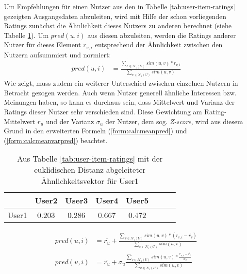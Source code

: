 Um Empfehlungen für einen Nutzer aus den in Tabelle \ref{tab:user-item-ratings} gezeigten Ausgangsdaten abzuleiten, wird mit Hilfe der schon vorliegenden Ratings zunächst die Ähnlichkeit dieses Nutzers zu anderen berechnet (siehe Tabelle \ref{tab:user-user-sim}). Um $pred(u,i)$ aus diesen abzuleiten, werden die Ratings anderer Nutzer für dieses Element $r_{v,i}$ entsprechend der Ähnlichkeit zwischen den Nutzern aufsummiert und normiert:
\begin{align}
pred(u,i) & = \frac{ \sum_{v \in \mathcal{N}_i(U)} sim(u, v)*r_{v,i}}{ \sum_{v \in \mathcal{N}_i(U)} sim(u,v) } \label{form:calcpred}
\end{align}
Wie \citep{Herlocker:2002:EAD:593967.594047} zeigt, muss zudem ein weiterer Unterschied zwischen einzelnen Nutzern in Betracht gezogen werden. Auch wenn Nutzer generell ähnliche Interessen bzw. Meinungen haben, so kann es durchaus sein, dass Mittelwert und Varianz der Ratings dieser Nutzer sehr verschieden sind. Diese Gewichtung am Rating-Mittelwert $\overline{r_u}$ und der Varianz  $\sigma_u$ der Nutzer, dem sog. \textit{Z-score}, wird aus diesem Grund in den erweiterten Formeln (\ref{form:calcmeanpred}) und (\ref{form:calcmeanvarpred}) beachtet. \citep{hb_04,Huete:2012:UPA:2206442.2206675} 
\begin{table}
  \centering
  \begin{tabular}{ | l || c | c | c | c | c | c | c | }
    \hline
           & User2 & User3 & User4 & User5 \\ \hline
User1 &    0.203 &	0.286 &	0.667 & 0.472 \\	
    \hline
  \end{tabular}
  \caption{\footnotesize Aus Tabelle \ref{tab:user-item-ratings} mit der euklidischen Distanz abgeleiteter Ähnlichkeitsvektor für User1}
  \label{tab:user-user-sim}
\end{table}
\begin{align}
pred(u, i) & = \overline{r_u} + \frac{ \sum_{v \in \mathcal{N}_i(U)} sim(u, v)*(r_{v,i}-\overline{r_v}) } { \sum_{v \in \mathcal{N}_i(U)} sim(u,v) } \label{form:calcmeanpred} \\
pred(u, i) & = \overline{r_u} + \sigma_u \frac{ \sum_{v \in \mathcal{N}_i(U)} sim(u, v)*\frac{r_{v,i}-\overline{r_v}}{\sigma_v} } { \sum_{v \in \mathcal{N}_i(U)} sim(u,v) } \label{form:calcmeanvarpred}
\end{align}

